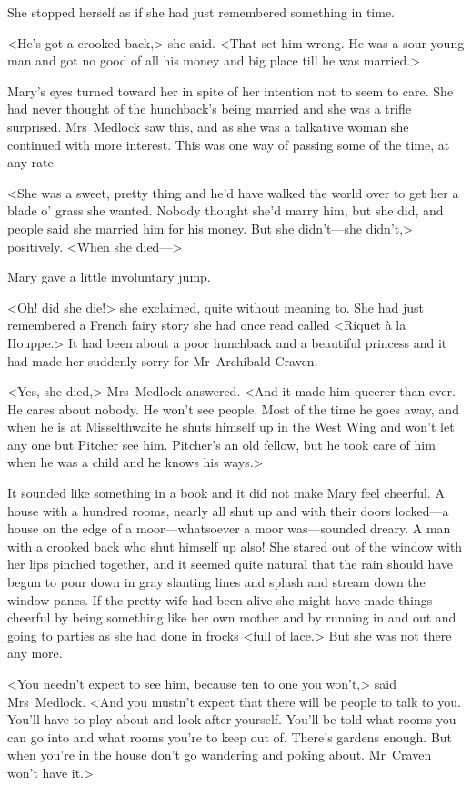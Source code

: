 She stopped herself as if she had just remembered something in time.

<He's got a crooked back,> she said. <That set him wrong. He was a sour young man and got no good of all his money and big place till he was married.>

Mary's eyes turned toward her in spite of her intention not to seem to care. She had never thought of the hunchback's being married and she was a trifle surprised. Mrs~Medlock saw this, and as she was a talkative woman she continued with more interest. This was one way of passing some of the time, at any rate.

<She was a sweet, pretty thing and he'd have walked the world over to get her a blade o' grass she wanted. Nobody thought she'd marry him, but she did, and people said she married him for his money. But she didn't—she didn't,> positively. <When she died—>

Mary gave a little involuntary jump.

<Oh! did she die!> she exclaimed, quite without meaning to. She had just remembered a French fairy story she had once read called <Riquet à la Houppe.> It had been about a poor hunchback and a beautiful princess and it had made her suddenly sorry for Mr~Archibald Craven.

<Yes, she died,> Mrs~Medlock answered. <And it made him queerer than ever. He cares about nobody. He won't see people. Most of the time he goes away, and when he is at Misselthwaite he shuts himself up in the West Wing and won't let any one but Pitcher see him. Pitcher's an old fellow, but he took care of him when he was a child and he knows his ways.>

It sounded like something in a book and it did not make Mary feel cheerful. A house with a hundred rooms, nearly all shut up and with their doors locked—a house on the edge of a moor—whatsoever a moor was—sounded dreary. A man with a crooked back who shut himself up also! She stared out of the window with her lips pinched together, and it seemed quite natural that the rain should have begun to pour down in gray slanting lines and splash and stream down the window-panes. If the pretty wife had been alive she might have made things cheerful by being something like her own mother and by running in and out and going to parties as she had done in frocks <full of lace.> But she was not there any more.

<You needn't expect to see him, because ten to one you won't,> said Mrs~Medlock. <And you mustn't expect that there will be people to talk to you. You'll have to play about and look after yourself. You'll be told what rooms you can go into and what rooms you're to keep out of. There's gardens enough. But when you're in the house don't go wandering and poking about. Mr~Craven won't have it.>

